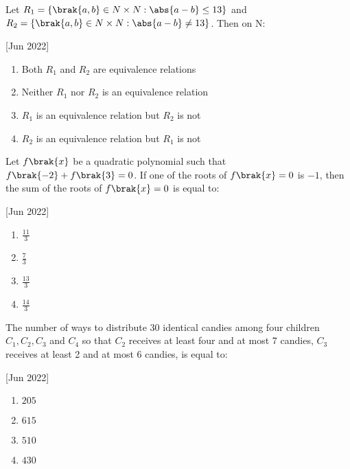 \iffalse
	\title{2022}
	\author{AI24BTECH11003}
	\section{mcq-single}
\fi

    \item Let $R_1=\{\brak{a,b}\in N\times N: \abs{a-b}\leq13\}$ and $R_2=\{\brak{a,b}\in N\times N: \abs{a-b}\neq13\}$. Then on N:
    
    \hfill[Jun 2022]

        \begin{multicols}{2}
            \begin{enumerate}
                \item Both $R_1$ and $R_2$ are equivalence relations
                \item Neither $R_1$ nor $R_2$ is an equivalence relation
                \item $R_1$ is an equivalence relation but $R_2$ is not
                \item $R_2$ is an equivalence relation but $R_1$ is not
            \end{enumerate}
        \end{multicols}

    \item Let $f\brak{x}$ be a quadratic polynomial such that $f\brak{-2}+f\brak{3}=0$. If one of the roots of $f\brak{x}=0$ is $-1$, then the sum of the roots of $f\brak{x}=0$ is equal to:
    
    \hfill[Jun 2022]

		\begin{multicols}{4}
			\begin{enumerate}
				\item $\frac{11}{3}$
				\item $\frac{7}{3}$
				\item $\frac{13}{3}$
				\item $\frac{14}{3}$
			\end{enumerate}
		\end{multicols}

    \item The number of ways to distribute 30 identical candies among four children $C_1,C_2,C_3$ and $C_4$ so that $C_2$ receives at least four and at most 7 candies, $C_3$ receives at least 2 and at most 6 candies, is equal to:
    
    \hfill[Jun 2022]

        \begin{multicols}{4}
            \begin{enumerate}
                \item $205$
                \item $615$
                \item $510$
                \item $430$
            \end{enumerate}
        \end{multicols}

